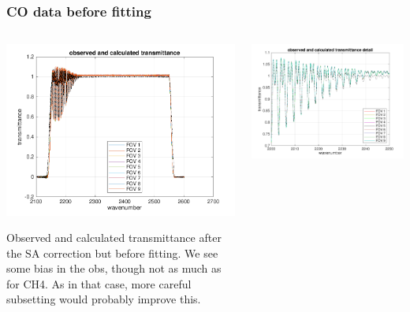 \documentclass[10pt]{beamer}
\begin{document}
\begin{frame}
\frametitle{CO data before fitting}
\begin{columns}[t]
\begin{column}{0.5\textwidth}  
  \begin{centering}
  \includegraphics[width=\textwidth]{figures/spec_test2_CO_all.png}
  \end{centering}\vspace{3mm}

Observed and calculated transmittance after the SA correction but
before fitting.  We see some bias in the obs, though not as much as
for CH4.  As in that case, more careful subsetting would probably
improve this.

\end{column}

\begin{column}{0.5\textwidth}
  \begin{centering}
  \includegraphics[width=\textwidth]{figures/spec_test2_CO_zoom.png}
  \end{centering}\vspace{3mm}


\end{column}
\end{columns}
\end{frame}
\end{document}
